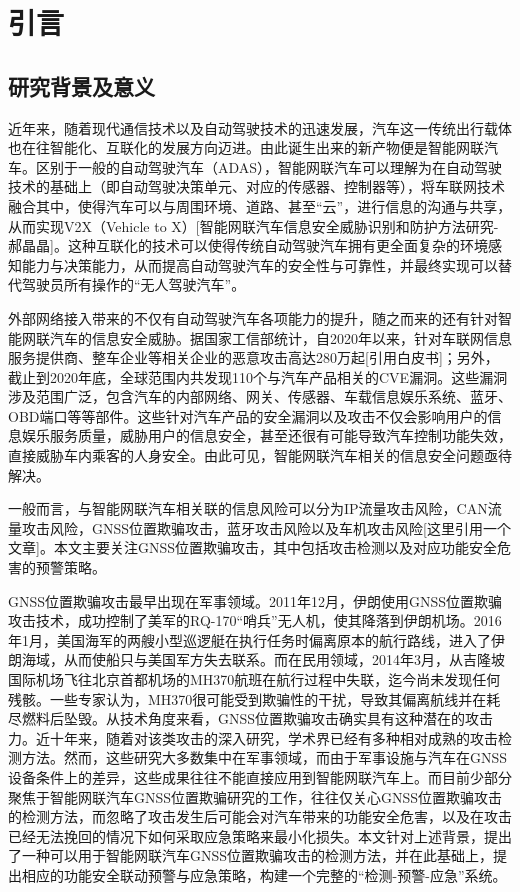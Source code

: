 \section{引言}

\subsection{研究背景及意义}
近年来，随着现代通信技术以及自动驾驶技术的迅速发展，汽车这一传统出行载体也在往智能化、互联化的发展方向迈进。由此诞生出来的新产物便是智能网联汽车。区别于一般的自动驾驶汽车（ADAS），智能网联汽车可以理解为在自动驾驶技术的基础上（即自动驾驶决策单元、对应的传感器、控制器等），将车联网技术融合其中，使得汽车可以与周围环境、道路、甚至“云”，进行信息的沟通与共享，从而实现V2X（Vehicle to X）[智能网联汽车信息安全威胁识别和防护方法研究-郝晶晶]。这种互联化的技术可以使得传统自动驾驶汽车拥有更全面复杂的环境感知能力与决策能力，从而提高自动驾驶汽车的安全性与可靠性，并最终实现可以替代驾驶员所有操作的“无人驾驶汽车”。

外部网络接入带来的不仅有自动驾驶汽车各项能力的提升，随之而来的还有针对智能网联汽车的信息安全威胁。据国家工信部统计，自2020年以来，针对车联网信息服务提供商、整车企业等相关企业的恶意攻击高达280万起[引用白皮书]；另外，截止到2020年底，全球范围内共发现110个与汽车产品相关的CVE漏洞。这些漏洞涉及范围广泛，包含汽车的内部网络、网关、传感器、车载信息娱乐系统、蓝牙、OBD端口等等部件。这些针对汽车产品的安全漏洞以及攻击不仅会影响用户的信息娱乐服务质量，威胁用户的信息安全，甚至还很有可能导致汽车控制功能失效，直接威胁车内乘客的人身安全。由此可见，智能网联汽车相关的信息安全问题亟待解决。

一般而言，与智能网联汽车相关联的信息风险可以分为IP流量攻击风险，CAN流量攻击风险，GNSS位置欺骗攻击，蓝牙攻击风险以及车机攻击风险[这里引用一个文章]。本文主要关注GNSS位置欺骗攻击，其中包括攻击检测以及对应功能安全危害的预警策略。

GNSS位置欺骗攻击最早出现在军事领域。2011年12月，伊朗使用GNSS位置欺骗攻击技术，成功控制了美军的RQ-170“哨兵”无人机，使其降落到伊朗机场。2016年1月，美国海军的两艘小型巡逻艇在执行任务时偏离原本的航行路线，进入了伊朗海域，从而使船只与美国军方失去联系。而在民用领域，2014年3月，从吉隆坡国际机场飞往北京首都机场的MH370航班在航行过程中失联，迄今尚未发现任何残骸。一些专家认为，MH370很可能受到欺骗性的干扰，导致其偏离航线并在耗尽燃料后坠毁。从技术角度来看，GNSS位置欺骗攻击确实具有这种潜在的攻击力\cite{bian2017research}。近十年来，随着对该类攻击的深入研究，学术界已经有多种相对成熟的攻击检测方法。然而，这些研究大多数集中在军事领域，而由于军事设施与汽车在GNSS设备条件上的差异，这些成果往往不能直接应用到智能网联汽车上。而目前少部分聚焦于智能网联汽车GNSS位置欺骗研究的工作，往往仅关心GNSS位置欺骗攻击的检测方法，而忽略了攻击发生后可能会对汽车带来的功能安全危害，以及在攻击已经无法挽回的情况下如何采取应急策略来最小化损失。本文针对上述背景，提出了一种可以用于智能网联汽车GNSS位置欺骗攻击的检测方法，并在此基础上，提出相应的功能安全联动预警与应急策略，构建一个完整的“检测-预警-应急”系统。

